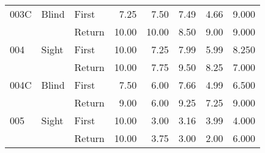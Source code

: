 \begin{table}[!htb]
\begin{tabular}{lllrrrrr}
003C & Blind & First &   7.25 &   7.50 &                                                  7.49 &                                                   4.66 &   9.000 \\
    &       & Return &  10.00 &  10.00 &                                                  8.50 &                                                   9.00 &   9.000 \\
004 & Sight & First &  10.00 &   7.25 &                                                  7.99 &                                                   5.99 &   8.250 \\
    &       & Return &  10.00 &   7.75 &                                                  9.50 &                                                   8.25 &   7.000 \\
004C & Blind & First &   7.50 &   6.00 &                                                  7.66 &                                                   4.99 &   6.500 \\
    &       & Return &   9.00 &   6.00 &                                                  9.25 &                                                   7.25 &   9.000 \\
005 & Sight & First &  10.00 &   3.00 &                                                  3.16 &                                                   3.99 &   4.000 \\
    &       & Return &  10.00 &   3.75 &                                                  3.00 &                                                   2.00 &   6.000 \\
\bottomrule
\end{tabular}
\end{table}

